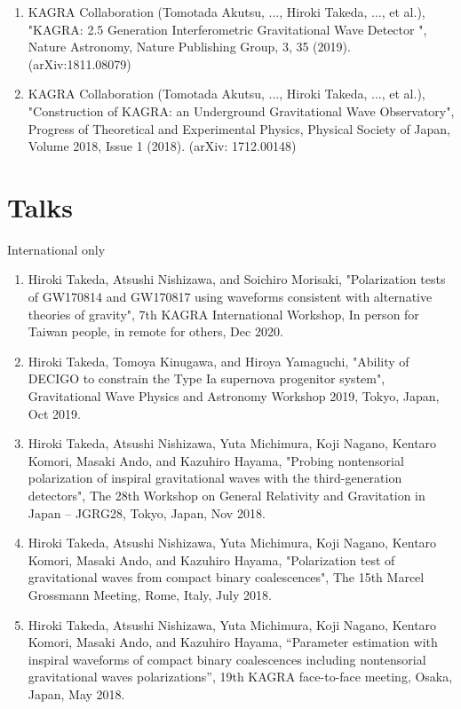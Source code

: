\documentclass[12pt,a4paper]{article}
\begin{document}
\begin{enumerate}
\item KAGRA Collaboration (Tomotada Akutsu, ..., Hiroki Takeda, ..., et al.), "KAGRA: 2.5 Generation Interferometric Gravitational Wave Detector ", Nature Astronomy, Nature Publishing Group, 3, 35 (2019). (arXiv:1811.08079)

\item KAGRA Collaboration (Tomotada Akutsu, ..., Hiroki Takeda, ..., et al.), "Construction of KAGRA: an Underground Gravitational Wave Observatory", Progress of Theoretical and Experimental Physics, Physical Society of Japan, Volume 2018, Issue 1 (2018). (arXiv: 1712.00148)

\end{enumerate}

\section*{Talks}
International only
\begin{enumerate}
\item Hiroki Takeda, Atsushi Nishizawa, and Soichiro Morisaki, "Polarization tests of GW170814 and GW170817 using waveforms consistent with alternative theories of gravity", 7th KAGRA International Workshop, In person for Taiwan people, in remote for others, Dec 2020.

\item Hiroki Takeda, Tomoya Kinugawa, and Hiroya Yamaguchi, "Ability of DECIGO to constrain the Type Ia supernova progenitor system", Gravitational Wave Physics and Astronomy Workshop 2019, Tokyo, Japan, Oct 2019.

\item Hiroki Takeda, Atsushi Nishizawa, Yuta Michimura, Koji Nagano, Kentaro Komori, Masaki Ando, and Kazuhiro Hayama, "Probing nontensorial polarization of inspiral gravitational waves with the third-generation detectors", The 28th Workshop on General Relativity and Gravitation in Japan – JGRG28, Tokyo, Japan, Nov 2018.

\item Hiroki Takeda, Atsushi Nishizawa, Yuta Michimura, Koji Nagano, Kentaro Komori, Masaki Ando, and Kazuhiro Hayama, "Polarization test of gravitational waves from compact binary coalescences", The 15th Marcel Grossmann Meeting, Rome, Italy, July 2018.

\item Hiroki Takeda, Atsushi Nishizawa, Yuta Michimura, Koji Nagano, Kentaro Komori, Masaki Ando, and Kazuhiro Hayama, “Parameter estimation with inspiral waveforms of compact binary coalescences including nontensorial gravitational waves polarizations”, 19th KAGRA face-to-face meeting, Osaka, Japan, May 2018.

\end{enumerate}
\end{document}
